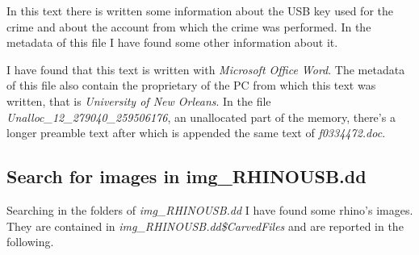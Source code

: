 \documentclass{article}
\begin{document}
In this text there is written some information about the USB key used for the crime and about the account from which the crime was performed.
In the metadata of this file I have found some other information about it.

I have found that this text is written with \textit{Microsoft Office Word}.
The metadata of this file also contain the proprietary of the PC from which this text was written, that is \textit{University of New Orleans}.
In the file \textit{Unalloc\_12\_279040\_259506176}, an unallocated part of the memory, there's a longer preamble text after which is appended the same text of \textit{f0334472.doc}.

\subsection{Search for images in img\_RHINOUSB.dd}
Searching in the folders of \textit{img\_RHINOUSB.dd} I have found some rhino's images. They are contained in \textit{\/img\_RHINOUSB.dd\/\$CarvedFiles\/} and are reported in the following.
\end{document}
